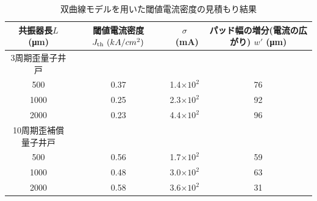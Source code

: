 \begin{table}[h]
  \caption{双曲線モデルを用いた閾値電流密度の見積もり結果}
  \label{table:table_w_prime}
  \centering
  \begin{tabular}{cccc}
    \hline
    共振器長$L$ (\si{\micro\metre})  &  閾値電流密度 $J_{\rm{th}} \ (kA/cm^2)$ &$\sigma$\ (\si{mA})& パッド幅の増分(電流の広がり)  $w'$ (\si{\micro\metre}) \\
    \hline \hline
    3周期歪量子井戸\\
     500 & 0.37 & 1.4$\times 10^2$ &76\\
    1000  & 0.25 & 2.3$\times10^2$ &92\\
    2000  & 0.23 & 4.4$\times10^2$ &96\\
    10周期歪補償量子井戸\\ 
      500 & 0.56 & 1.7$\times 10^2$ &59\\
    1000  & 0.48 & 3.0$\times 10^2$ &63\\
    2000  & 0.58 & 3.6$\times 10^2$ &31\\ 
    \hline
  \end{tabular}
\end{table}
